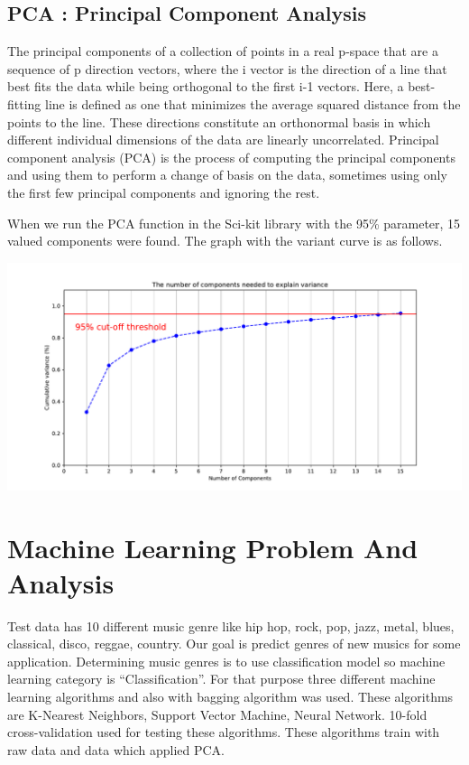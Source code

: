 \documentclass{article}
\begin{document}
\subsection{PCA : Principal Component Analysis }

The principal components of a collection of points in a real p-space that are a sequence of p direction vectors, where the i vector is the direction of a line that best fits the data while being orthogonal to the first i-1 vectors. Here, a best-fitting line is defined as one that minimizes the average squared distance from the points to the line. These directions constitute an orthonormal basis in which different individual dimensions of the data are linearly uncorrelated. Principal component analysis (PCA) is the process of computing the principal components and using them to perform a change of basis on the data, sometimes using only the first few principal components and ignoring the rest.\newline

When we run the PCA function in the Sci-kit library with the 95\% parameter, 15 valued components were found. The graph with the variant curve is as follows.


\begin{center}
    \vspace{1em}
        \includegraphics[scale=0.55]{graphs/Pca_Test.pdf}
    \vspace{1em}
\end{center}

\section{ Machine Learning Problem And Analysis}

Test data has 10 different music genre like hip hop, rock, pop, jazz, metal, blues, classical, disco, reggae, country. Our goal is predict genres of new musics for some application. Determining music genres is to use classification model so machine learning category is “Classification”. For that purpose three different machine learning algorithms and also with bagging algorithm was used. These algorithms are K-Nearest Neighbors, Support Vector Machine, Neural Network. 10-fold cross-validation used for testing these algorithms. These algorithms train with raw data and data which applied PCA. \newline
\end{document}
